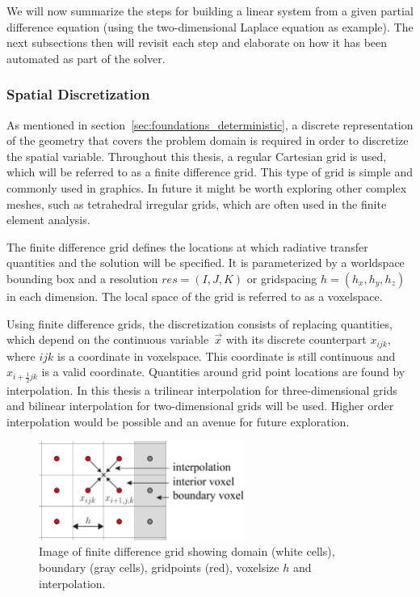 We will now summarize the steps for building a linear system from a given partial difference equation (using the two-dimensional Laplace equation as example). The next subsections then will revisit each step and elaborate on how it has been automated as part of the solver.

\subsubsection*{Spatial Discretization}

As mentioned in section~\ref{sec:foundations_deterministic}, a discrete representation of the geometry that covers the problem domain is required in order to discretize the spatial variable. Throughout this thesis, a regular Cartesian grid is used, which will be referred to as a finite difference grid. This type of grid is simple and commonly used in graphics. In future it might be worth exploring other complex meshes, such as tetrahedral irregular grids, which are often used in the finite element analysis. 

The finite difference grid defines the locations at which radiative transfer quantities and the solution will be specified. It is parameterized by a worldspace bounding box and a resolution $res=(I,J,K)$ or gridspacing $h=(h_x, h_y, h_z)$ in each dimension. The local space of the grid is referred to as a voxelspace.

Using finite difference grids, the discretization consists of replacing quantities, which depend on the continuous variable~$\vec{x}$ with its discrete counterpart $x_{ijk}$, where $ijk$ is a coordinate in voxelspace. This coordinate is still continuous and $x_{i+\frac{1}{2}jk}$ is a valid coordinate. Quantities around grid point locations are found by interpolation. In this thesis a trilinear interpolation for three-dimensional grids and bilinear interpolation for two-dimensional grids will be used. Higher order interpolation would be possible and an avenue for future exploration.
\begin{figure}[h]
\centering
\includegraphics[width=0.6\textwidth]{04_pn_method/figures/fig_fd_grids.pdf}
\caption{Image of finite difference grid showing domain (white cells), boundary (gray cells), gridpoints (red), voxelsize $h$ and interpolation.}
\label{fig:pn_solver_finite_difference_grid}
\end{figure}

